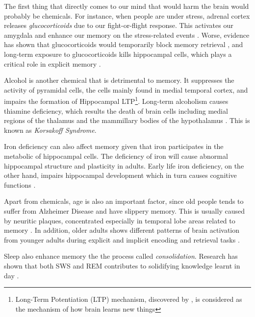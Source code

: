 \documentclass{article}
\begin{document}
The first thing that directly comes to our mind that would harm the brain would probably be chemicals. For instance, when people are under stress, adrenal cortex releases \textit{glucocorticoids} due to our fight-or-flight response. This activates our amygdala and enhance our memory on the stress-related events \autocite{sapolskyStressAgingBrain1992}. Worse, evidence has shown that glucocorticoids would temporarily block memory retrieval \autocite[pp.119-144]{roozendaalStressMemoryAmygdala2009}, and long-term exposure to glucocorticoids kills hippocampal cells, which plays a critical role in explicit memory \autocite{sapolskyStressAgingBrain1992}. 

Alcohol is another chemical that is detrimental to memory. It suppresses the activity of pyramidal cells, the cells mainly found in medial temporal cortex, and impairs the formation of Hippocampal LTP\footnote{Long-Term Potentiation (LTP) mechanism, discovered by \textcite{blissLonglastingPotentiationSynaptic1973}, is considered as the mechanism of how brain learns new things}. Long-term alcoholism causes thiamine deficiency, which results the death of brain cells including medial regions of the thalamus and the mammillary bodies of the hypothalamus \autocite{martinRoleThiamineDeficiency2003}. This is known as \textit{Korsakoff Syndrome}. 

Iron deficiency can also affect memory given that iron participates in the metabolic of hippocampal cells. The deficiency of iron will cause abnormal hippocampal structure and plasticity in adults. Early life iron deficiency, on the other hand, impairs hippocampal development which in turn causes cognitive functions \autocite{frethamRoleIronLearning2011}.

Apart from chemicals, age is also an important factor, since old people tends to suffer from Alzheimer Disease and have slippery memory. This is usually caused by neuritic plaques, concentrated especially in temporal lobe areas related to memory \autocite{kolbIntroductionBrainBehavior2019}. In addition, older adults shows different patterns of brain activation from younger adults during explicit and implicit encoding and retrieval tasks \autocite{backmanBrainActivationYoung1997}.

Sleep also enhance memory the the process called \textit{consolidation}. Research has shown that both SWS and REM contributes to solidifying knowledge learnt in day \autocite{diekelmannMemoryFunctionSleep2010}.

\printbibliography{}
\end{document}
